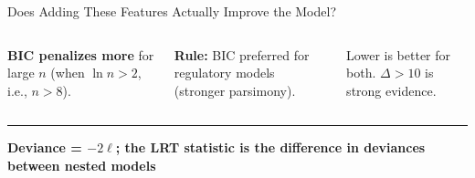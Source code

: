 \documentclass[8pt,aspectratio=169]{beamer}
\newcommand{\bottomnote}[1]{%
\vfill
\vspace{-2mm}
\textcolor{mllavender2}{\rule{\textwidth}{0.4pt}}
\vspace{1mm}
\footnotesize
\textbf{#1}
}
\begin{document}
\begin{frame}[t]{Does Adding These Features Actually Improve the Model?}
\begin{columns}[T]
{{\vspace{2mm}
\textbf{BIC penalizes more} for large $n$ (when $\ln n > 2$, i.e., $n > 8$).

\vspace{2mm}
\textbf{Rule:} BIC preferred for regulatory models (stronger parsimony).

\vspace{2mm}
Lower is better for both. $\Delta > 10$ is strong evidence.
}}
\end{columns}

\bottomnote{Deviance = $-2\ell$; the LRT statistic is the difference in deviances between nested models}
\end{frame}

\end{document}
